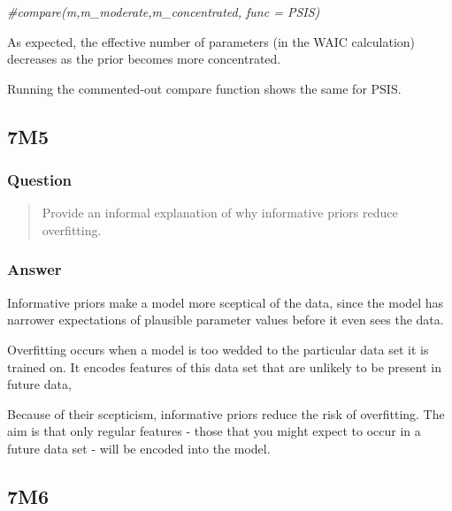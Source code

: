 \documentclass[
]{book}
\newenvironment{Shaded}{\begin{snugshade}}{\end{snugshade}}
\newcommand{\CommentTok}[1]{\textcolor[rgb]{0.56,0.35,0.01}{\textit{#1}}}
\begin{document}
\begin{Shaded}
\begin{Highlighting}[]
\CommentTok{\#compare(m,m\_moderate,m\_concentrated, func = PSIS)}
\end{Highlighting}
\end{Shaded}

As expected, the effective number of parameters (in the WAIC calculation) decreases as the prior becomes more concentrated.

Running the commented-out compare function shows the same for PSIS.

\hypertarget{m5-3}{%
\subsection*{7M5}\label{m5-3}}

\hypertarget{question-68}{%
\subsubsection*{Question}\label{question-68}}

\begin{quote}
Provide an informal explanation of why informative priors reduce overfitting.
\end{quote}

\hypertarget{answer-68}{%
\subsubsection*{Answer}\label{answer-68}}

Informative priors make a model more sceptical of the data, since the model has narrower expectations of plausible parameter values before it even sees the data.

Overfitting occurs when a model is too wedded to the particular data set it is trained on. It encodes features of this data set that are unlikely to be present in future data,

Because of their scepticism, informative priors reduce the risk of overfitting. The aim is that only regular features - those that you might expect to occur in a future data set - will be encoded into the model.

\hypertarget{m6-3}{%
\subsection*{7M6}\label{m6-3}}
\end{document}
